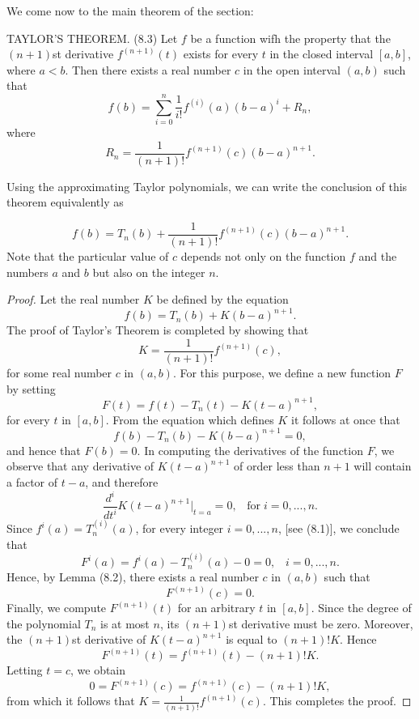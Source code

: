 We come now to the main theorem of the section:

\begin{theorem}
TAYLOR'S THEOREM. (8.3) Let $f$ be a function wifh the property that the $(n + 1)$st derivative $f^{(n+1)}(t)$ exists for every $t$ in the closed interval $[a, b]$, where $a < b$. Then there exists a real number $c$ in the open interval $(a, b)$ such that
$$
f(b) = \sum_{i=0}^n \frac{1}{i!} f^{(i)}(a)(b - a)^i + R_n,
$$
\noindent where
$$
R_n = \frac{1}{(n +1)!} f^{(n+1)}(c)(b - a)^{n+1} .
$$
\end{theorem}

Using the approximating Taylor polynomials, we can write the conclusion of this theorem equivalently as

\begin{equation}
f(b) = T_n(b) + \frac{1}{(n + 1)!} f^{(n+1)}(c)(b-a)^{n+1} . 
\label{eq9.8.2}
\end{equation}
\noindent Note that the particular value of $c$ depends not only on the function $f$ and the numbers $a$ and $b$ but also on the integer $n$.

\begin{proof}
Let the real number $K$ be defined by the equation 
$$
f(b) = T_n(b) + K(b - a)^{n+1}. 
$$
The proof of Taylor's Theorem is completed by showing that
$$
K = \frac{1}{(n + 1)!} f^{(n+1)}(c),
$$
for some real number $c$ in $(a, b)$. For this purpose, we define a new function $F$ by setting
$$
F(t) = f(t) - T_n(t) - K(t - a)^{n+1}, 
$$
for every $t$ in $[a, b]$. From the equation which defines  $K$ it follows at once that 
$$
f (b) - T_n(b) - K(b - a)^{n+1} = 0,
$$
and hence that $F(b) = 0$. In computing the derivatives of the function $F$, we observe that any derivative of $K(t-a)^{n+1}$ of order less than $n + 1$ will contain a factor of $t - a$, and therefore
$$
\frac{d^i}{dt^i} K(t-a)^{n+1}|_{t=a} = 0, \;\;\;\mbox{for}\; i = 0, ... , n.
$$
Since $f^{i}(a) = T_n^{(i)}(a)$, for every integer $i = 0, . . ., n$, [see (8.1)], we conclude that
$$
F^{i}  (a) = f^{i}(a) - T_n^{(i)}(a) - 0 = 0, \;\;\; i = 0,...,n. 
$$
Hence, by Lemma (8.2), there exists a real number $c$ in $(a, b)$ such that
$$
F^{(n+1)} (c) = 0. 
$$
Finally, we compute $F^{(n+1)}(t)$ for an arbitrary $t$ in $[a, b]$. Since the degree of the polynomial $T_n$ is at most $n$, its $(n + 1)$st derivative must be zero. Moreover, the $(n + 1)$st derivative of $K(t - a)^{n+1}$ is equal to $(n + 1)!K$. Hence 
$$
F^{(n+1)}(t) = f^{(n+1)} (t) - (n + 1)! K.
$$
Letting $t = c$, we obtain
$$
0 = F^{(n+1)}(c) = f^{(n+1)} (c) - (n + 1)! K, 
$$
from which it follows that $K = \frac{1}{(n+1)!} f^{(n+1)}(c)$. This completes the proof.
\end{proof}

